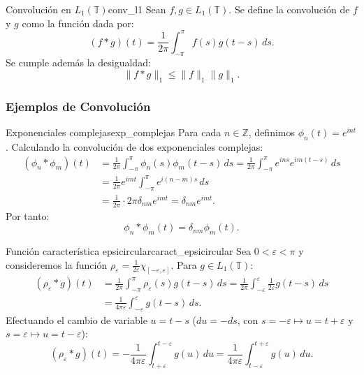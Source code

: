 \begin{definicion}{Convolución en $L_1(\mathbb{T})$}{conv_l1}
Sean $f, g \in L_1(\mathbb{T})$. Se define la convolución de $f$ y $g$ como la función dada por:
\[
(f * g)(t) = \frac{1}{2\pi} \int_{-\pi}^\pi f(s) g(t - s) \, ds.
\]
Se cumple además la desigualdad:
\[
\|f * g\|_1 \le \|f\|_1 \|g\|_1.
\]
\end{definicion}

\subsubsection*{Ejemplos de Convolución}

\begin{ejemplo}{Exponenciales complejas}{exp_complejas}
Para cada $n \in \mathbb{Z}$, definimos $\phi_n(t) = e^{int}$. Calculando la convolución de dos exponenciales complejas:
\begin{align*}
(\phi_n * \phi_m)(t) &= \frac{1}{2\pi} \int_{-\pi}^\pi \phi_n(s) \phi_m(t - s) \, ds = \frac{1}{2\pi} \int_{-\pi}^\pi e^{ins} e^{im(t - s)} \, ds \\
&= \frac{1}{2\pi} e^{imt} \int_{-\pi}^\pi e^{i(n - m)s} \, ds \\
&= \frac{1}{2\pi} \cdot 2\pi \delta_{nm} e^{imt} = \delta_{nm} e^{imt}.
\end{align*}
Por tanto:
\[
\phi_n * \phi_m (t) = \delta_{nm} \phi_m(t).
\]
\end{ejemplo}

\begin{ejemplo}{Función característica epsicircular}{caract_epsicircular}
Sea $0 < \varepsilon < \pi$ y consideremos la función $\rho_\varepsilon = \frac{1}{2\varepsilon} \chi_{[-\varepsilon, \varepsilon]}$. Para $g \in L_1(\mathbb{T})$:
\begin{align*}
(\rho_\varepsilon * g)(t) &= \frac{1}{2\pi} \int_{-\pi}^\pi \rho_\varepsilon(s) g(t - s) \, ds = \frac{1}{2\pi} \int_{-\varepsilon}^\varepsilon \frac{1}{2\varepsilon} g(t - s) \, ds \\
&= \frac{1}{4\pi\varepsilon} \int_{-\varepsilon}^\varepsilon g(t - s) \, ds.
\end{align*}
Efectuando el cambio de variable $u = t - s$ ($du = -ds$, con $s = -\varepsilon \mapsto u = t + \varepsilon$ y $s = \varepsilon \mapsto u = t - \varepsilon$):
\[
(\rho_\varepsilon * g)(t) = -\frac{1}{4\pi\varepsilon} \int_{t+\varepsilon}^{t-\varepsilon} g(u) \, du = \frac{1}{4\pi\varepsilon} \int_{t-\varepsilon}^{t+\varepsilon} g(u) \, du.
\]
\end{ejemplo}

